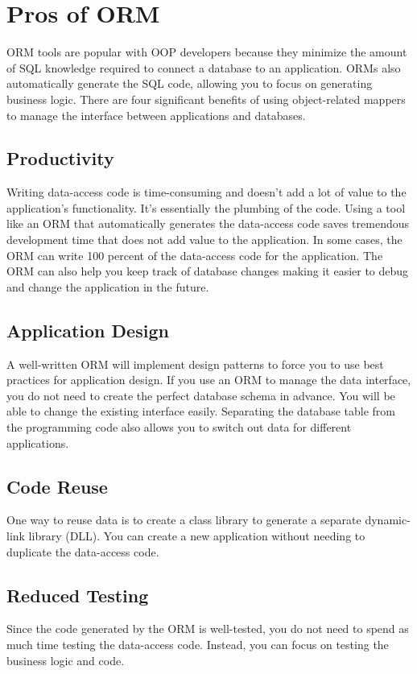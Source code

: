 \documentclass[10pt,a4paper,twoside]{article}
\begin{document}
\section{Pros of ORM}
\item ORM tools are popular with OOP developers because they minimize the amount of SQL knowledge required to connect a database to an application. ORMs also automatically generate the SQL code, allowing you to focus on generating business logic. There are four significant benefits of using object-related mappers to manage the interface between applications and databases.

\subsection{Productivity}
\item Writing data-access code is time-consuming and doesn’t add a lot of value to the application’s functionality. It’s essentially the plumbing of the code. Using a tool like an ORM that automatically generates the data-access code saves tremendous development time that does not add value to the application. In some cases, the ORM can write 100 percent of the data-access code for the application. The ORM can also help you keep track of database changes making it easier to debug and change the application in the future.

\subsection{Application Design}
A well-written ORM will implement design patterns to force you to use best practices for application design. If you use an ORM to manage the data interface, you do not need to create the perfect database schema in advance. You will be able to change the existing interface easily. Separating the database table from the programming code also allows you to switch out data for different applications.

\subsection{Code Reuse}
One way to reuse data is to create a class library to generate a separate dynamic-link library (DLL). You can create a new application without needing to duplicate the data-access code.

\subsection{Reduced Testing}
Since the code generated by the ORM is well-tested, you do not need to spend as much time testing the data-access code. Instead, you can focus on testing the business logic and code.
\end{document}
